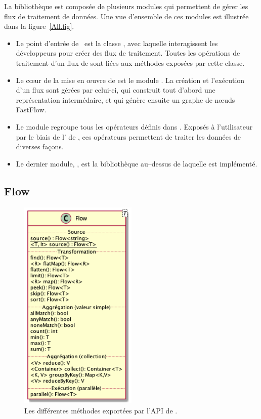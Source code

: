 La biblioth\`eque  est compos\'ee de plusieurs modules qui permettent de g\'erer les flux de traitement de donn\'ees. Une vue d'ensemble de ces modules est illustr\'ee dans la figure~\ref{All.fig}.

\begin{itemize}

\item Le point d'entr\'ee de \ppff\ est la classe , avec laquelle interagissent les d\'eveloppeurs pour cr\'eer des flux de traitement. Toutes les op\'erations de traitement d'un flux de  sont li\'ees aux m\'ethodes expos\'ees par cette classe. 

\item Le c\oe{}ur de la mise en \oe{}uvre de  est le module . La cr\'eation et l'ex\'ecution d'un flux sont g\'er\'ees par celui-ci, qui construit tout d'abord une représentation intermédaire, et qui génère ensuite un graphe de n\oe{}uds FastFlow.

\item  Le module  regroupe tous les op\'erateurs d\'efinis dans . Expos\'es \`a l'utilisateur par le biais de l' de , ces op\'erateurs permettent de traiter les donn\'ees de diverses façons.

\item Le dernier module, , est la biblioth\`eque au–dessus de laquelle  est impl\'ement\'e.


\end{itemize}

\subsection{Flow}

\begin{figure}
\centering
     \includegraphics[width=0.5\textwidth]{Figures/flow-details.png}
      \caption{Les diff\'erentes m\'ethodes export\'ees par l'API de .}
       \label{Flow.fig}
\end{figure}



